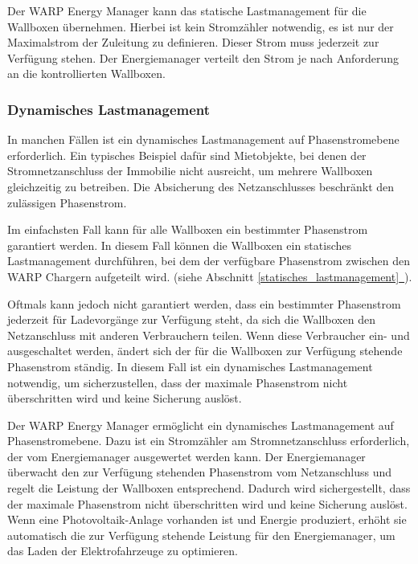 \documentclass[a4paper,10pt]{article}
\newcommand*{\fullref}[1]{Abschnitt \hyperref[{#1}]{\ref*{#1}~\nameref*{#1}}}
\begin{document}
\begin{multicols*}{2}
	Der WARP Energy Manager kann das statische Lastmanagement für die Wallboxen
	übernehmen. Hierbei ist kein Stromzähler notwendig, es ist nur der
	Maximalstrom der Zuleitung zu definieren. Dieser Strom muss jederzeit zur
	Verfügung stehen. Der Energiemanager verteilt den Strom
	je nach Anforderung an die kontrollierten Wallboxen.

	\vspace{-0.05cm}
	\subsubsection{Dynamisches Lastmanagement}
	\label{dynamisches_lastmanagement}

	In manchen Fällen ist ein dynamisches Lastmanagement auf Phasenstromebene erforderlich.
	Ein typisches Beispiel dafür sind Mietobjekte, bei denen der Stromnetzanschluss der
	Immobilie nicht ausreicht, um mehrere Wallboxen gleichzeitig zu betreiben.
	Die Absicherung des Netzanschlusses beschränkt den zulässigen Phasenstrom.

	Im einfachsten Fall kann für alle Wallboxen ein bestimmter Phasenstrom garantiert werden.
	In diesem Fall können die Wallboxen ein statisches Lastmanagement durchführen,
	bei dem der verfügbare Phasenstrom zwischen den WARP Chargern aufgeteilt wird. (siehe \fullref{statisches_lastmanagement}).

	Oftmals kann jedoch nicht garantiert werden, dass ein bestimmter Phasenstrom jederzeit
	für Ladevorgänge zur Verfügung steht, da sich die Wallboxen den Netzanschluss mit anderen Verbrauchern teilen.
	Wenn diese Verbraucher ein- und ausgeschaltet werden,
	ändert sich der für die Wallboxen zur Verfügung stehende Phasenstrom
	ständig. In diesem Fall ist ein dynamisches Lastmanagement notwendig, um
	sicherzustellen, dass der maximale Phasenstrom nicht überschritten wird und
	keine Sicherung auslöst.

	Der WARP Energy Manager ermöglicht ein dynamisches Lastmanagement auf Phasenstromebene.
	Dazu ist ein Stromzähler am Stromnetzanschluss erforderlich, der vom Energiemanager
	ausgewertet werden kann. Der Energiemanager überwacht den zur Verfügung stehenden
	Phasenstrom vom Netzanschluss und regelt die Leistung der Wallboxen entsprechend.
	Dadurch wird sichergestellt, dass der maximale Phasenstrom nicht überschritten wird
	und keine Sicherung auslöst. Wenn eine Photovoltaik-Anlage vorhanden ist und Energie
	produziert, erhöht sie automatisch die zur Verfügung stehende Leistung für den
	Energiemanager, um das Laden der Elektrofahrzeuge zu optimieren.


\end{multicols*}
\end{document}
